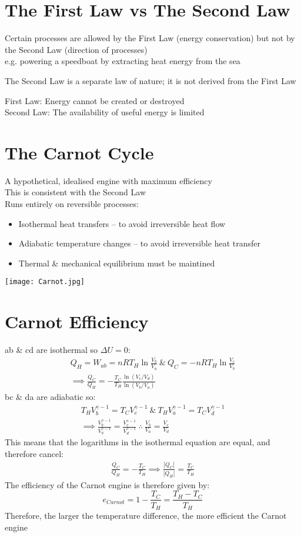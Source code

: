 \documentclass[a4paper, 11pt, fleqn, normalem]{report}
\begin{document}
\section{The First Law vs The Second Law}
Certain processes are allowed by the First Law (energy conservation) but not by the Second Law (direction of processes) \\
e.g. powering a speedboat by extracting heat energy from the sea

The Second Law is a separate law of nature; it is not derived from the First Law

First Law: Energy cannot be created or destroyed \\
Second Law: The availability of useful energy is limited

\section{The Carnot Cycle}
A hypothetical, idealised engine with maximum efficiency \\
This is consistent with the Second Law \\
Runs entirely on reversible processes:
\begin{itemize}
	\item Isothermal heat transfers -- to avoid irreversible heat flow
	\item Adiabatic temperature changes -- to avoid irreversible heat transfer
	\item Thermal \& mechanical equilibrium must be maintined
\end{itemize}
\texttt{[image: Carnot.jpg]}

\section{Carnot Efficiency}
ab \& cd are isothermal so ${\Delta}U = 0$:
\begin{gather*}
	Q_{H} = W_{ab} = nRT_{H}\ln{\frac{V_{b}}{V_{a}}} ~\&~ Q_{C} = -nRT_{H}\ln{\frac{V_{c}}{V_{b}}} \\
	\implies \frac{Q_{C}}{Q_{H}} = -\frac{T_{C}}{T_{H}}\frac{\ln{(V_{c}/V_{d})}}{\ln{(V_{b}/V_{a})}}
\end{gather*}
bc \& da are adiabatic so:
\begin{gather*}
	T_{H}V_{b}^{\gamma - 1} = T_{C}V_{c}^{\gamma - 1} ~\&~ T_{H}V_{a}^{\gamma - 1} = T_{C}V_{d}^{\gamma - 1} \\
	\implies \frac{V_{b}^{\gamma - 1}}{V_{a}^{\gamma - 1}} = \frac{V_{c}^{\gamma - 1}}{V_{d}^{\gamma - 1}} ~\therefore~ \frac{V_{b}}{V_{a}} = \frac{V_{c}}{V_{d}}
\end{gather*}
This means that the logarithms in the isothermal equation are equal, and therefore cancel:
\begin{gather*}
	\frac{Q_{C}}{Q_{H}} = -\frac{T_{C}}{T_{H}} \implies \frac{|Q_{C}|}{|Q_{H}|} = \frac{T_{C}}{T_{H}}
\end{gather*}
The efficiency of the Carnot engine is therefore given by:
\begin{equation*}
	e_{Carnot} = 1 - \frac{T_{C}}{T_{H}} = \frac{T_{H} - T_{C}}{T_{H}}
\end{equation*}
Therefore, the larger the temperature difference, the more efficient the Carnot engine
\end{document}
